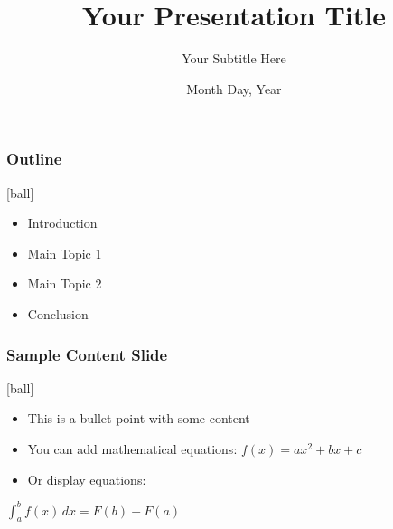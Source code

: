 \documentclass{beamer}
\date[] %
\begin{document}
\lstset{language=Python}

\title{Your Presentation Title}
\subtitle{Your Subtitle Here}
\date{Month Day, Year}

\frame{\titlepage}


\begin{frame}
\frametitle{Outline}
[ball]

\begin{itemize}
    \item Introduction
    \item Main Topic 1
    \item Main Topic 2
    \item Conclusion
\end{itemize}

\end{frame}


\begin{frame}[fragile]
\frametitle{Sample Content Slide}
[ball]

\begin{itemize}
    \item This is a bullet point with some content
    \vspace{0.3cm}
    \item You can add mathematical equations: $f(x) = ax^2 + bx + c$
    \vspace{0.3cm}
    \item Or display equations:
\end{itemize}

\vspace{0.3cm}

\begin{center}
    $\int_{a}^{b} f(x) \, dx = F(b) - F(a)$
\end{center}

\end{frame}

\end{document}
